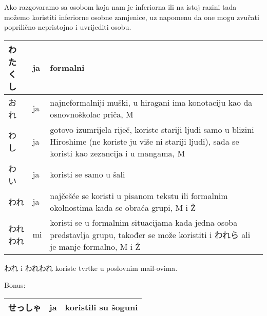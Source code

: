 	\vspace{10pt}
	
	
		Ako razgovaramo sa osobom koja nam je inferiorna ili na istoj razini tada možemo koristiti inferiorne osobne zamjenice, uz napomenu da one mogu zvučati poprilično nepristojno i uvrijediti osobu.
		
		\vspace{15pt}
	
	\vspace{10pt}
	
	
	
	\vspace{10pt}
	
	\begin{tabular}{|l|l|p{400pt}|}
		\hline
		わたくし&ja&formalni\\\hline
		おれ&ja&najneformalniji muški, u hiragani ima konotaciju kao da osnovnoškolac priča, M\\\hline
		わし&ja&gotovo izumrijela riječ, koriste stariji ljudi samo u blizini Hiroshime (ne koriste ju više ni stariji ljudi), sada se koristi kao zezancija i u mangama, M\\\hline
		わい&ja&koristi se samo u šali\\\hline
		われ&ja&najčešće se koristi u pisanom tekstu ili formalnim okolnostima kada se obraća grupi, M i Ž\\\hline
		われわれ&mi&koristi se u formalnim situacijama kada jedna osoba predstavlja grupu, također se može koristiti i われら ali je manje formalno, M i Ž\\\hline
	\end{tabular}

	\vspace{10pt}	
	
	われ i われわれ koriste tvrtke u poslovnim mail-ovima.
	
	\vspace{10pt}
	
	Bonus:
	\begin{tabular}{|l|l|l|}
		\hline
		せっしゃ&ja&koristili su šoguni\\\hline
	\end{tabular}
	
	\newpage
	

	\ten {}



